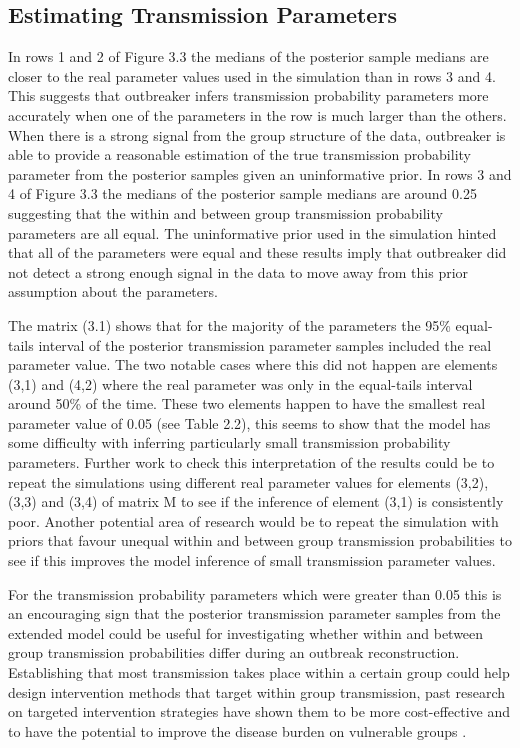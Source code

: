 \documentclass[11pt,a4paper]{report}
\begin{document}
\subsection{Estimating Transmission Parameters}
In rows 1 and 2 of Figure 3.3 the medians of the posterior sample medians are closer to the real parameter values used in the simulation than in rows 3 and 4. This suggests that outbreaker infers transmission probability parameters more accurately when one of the parameters in the row is much larger than the others. When there is a strong signal from the group structure of the data, outbreaker is able to provide a reasonable estimation of the true transmission probability parameter from the posterior samples given an uninformative prior. In rows 3 and 4 of Figure 3.3 the medians of the posterior sample medians are around 0.25 suggesting that the within and between group transmission probability parameters are all equal. The uninformative prior used in the simulation hinted that all of the parameters were equal and these results imply that outbreaker did not detect a strong enough signal in the data to move away from this prior assumption about the parameters. 

The matrix (3.1) shows that for the majority of the parameters the 95\% equal-tails interval of the posterior transmission parameter samples included the real parameter value. The two notable cases where this did not happen are elements (3,1) and (4,2) where the real parameter was only in the equal-tails interval around 50\% of the time. These two elements happen to have the smallest real parameter value of 0.05 (see Table 2.2), this seems to show that the model has some difficulty with inferring particularly small transmission probability parameters. Further work to check this interpretation of the results could be to repeat the simulations using different real parameter values for elements (3,2), (3,3) and (3,4) of matrix M to see if the inference of element (3,1) is consistently poor. Another potential area of research would be to repeat the simulation with priors that favour unequal within and between group transmission probabilities to see if this improves the model inference of small transmission parameter values.

For the transmission probability parameters which were greater than 0.05 this is an encouraging sign that the posterior transmission parameter samples from the extended model could be useful for investigating whether within and between group transmission probabilities differ during an outbreak reconstruction. Establishing that most transmission takes place within a certain group could help design intervention methods that target within group transmission, past research on targeted intervention strategies have shown them to be more cost-effective \citep{Lugner13} and to have the potential to improve the disease burden on vulnerable groups \citep{Dushoff07}.  
\end{document}
